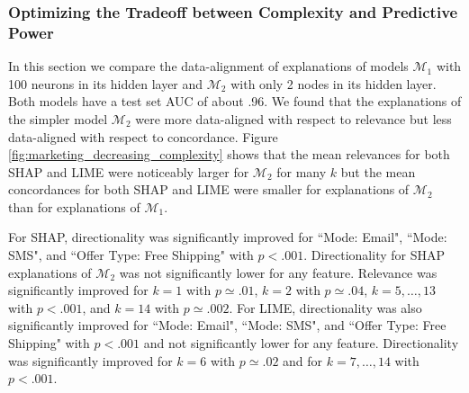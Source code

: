 \documentclass[mnsc,blindrev]{informs3}
\begin{document}
        \subsubsection{Optimizing the Tradeoff between Complexity and Predictive Power}
            In this section we compare the data-alignment of explanations of models $\mathcal{M}_1$ with 100 neurons in its hidden layer and $\mathcal{M}_2$ with only 2 nodes in its hidden layer. Both models have a test set AUC of about .96. We found that the explanations of the simpler model $\mathcal{M}_2$ were more data-aligned with respect to relevance but less data-aligned with respect to concordance. Figure \ref{fig:marketing_decreasing_complexity} shows that the mean relevances for both SHAP and LIME were noticeably larger for $\mathcal{M}_2$ for many $k$ but the mean concordances for both SHAP and LIME were smaller for explanations of $\mathcal{M}_2$ than for explanations of $\mathcal{M}_1$.

            For SHAP, directionality was significantly improved for ``Mode: Email", ``Mode: SMS", and ``Offer Type: Free Shipping" with $p<.001$. Directionality for SHAP explanations of $\mathcal{M}_2$ was not significantly lower for any feature. Relevance was significantly improved for $k=1$ with $p\simeq .01$, $k=2$ with $p\simeq .04$, $k=5,\ldots,13$ with $p<.001$, and $k=14$ with $p\simeq .002$.  For LIME, directionality was also significantly improved for ``Mode: Email", ``Mode: SMS", and ``Offer Type: Free Shipping" with $p<.001$ and not significantly lower for any feature. Directionality was significantly improved for $k=6$ with $p\simeq .02$ and for $k=7,\ldots,14$ with $p<.001$. 
\end{document}
